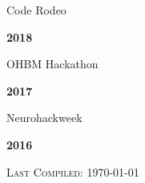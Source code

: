 \documentclass[10pt]{article}
\newenvironment{bottompar}{\par\vspace*{\fill}}{\clearpage}
\newcommand{\headstyle}{\scshape \normalsize \textcolor{light-gray}}
\begin{document}
\begin{minipage}[t]{.85\linewidth}
\flushleft
\noindent
Code Rodeo
\end{minipage}
\hfill
\begin{minipage}[t]{.15\linewidth}
\flushright
\noindent
\textsc{\textbf{2018}}
\end{minipage}

\begin{minipage}[t]{.85\linewidth}
\flushleft
\noindent
OHBM Hackathon
\end{minipage}
\hfill
\begin{minipage}[t]{.15\linewidth}
\flushright
\noindent
\textsc{\textbf{2017}}
\end{minipage}

\begin{minipage}[t]{.85\linewidth}
\flushleft
\noindent
Neurohackweek
\end{minipage}
\hfill
\begin{minipage}[t]{.15\linewidth}
\flushright
\noindent
\textsc{\textbf{2016}}
\end{minipage}

\begin{bottompar}
	\begin{center}
		\headstyle{Last Compiled: \today}
	\end{center}
\end{bottompar}
\end{document}
